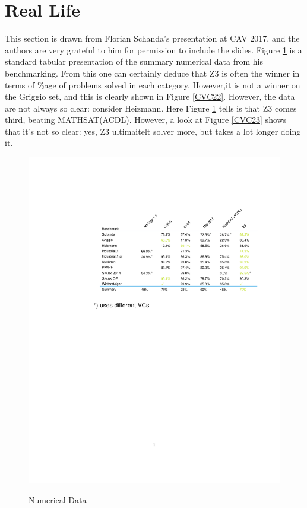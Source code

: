 \documentclass{easychair}
\begin{document}
\section{Real Life}
This section is drawn from Florian Schanda's presentation at CAV 2017, and the authors are very grateful to him for permission to include the slides.  Figure \ref{CVC16} is a standard tabular presentation of the summary numerical data from his benchmarking. From this one can certainly deduce that Z3 is often the winner in terms of \%age of problems solved in each category.  However,it is not a winner on the Griggio set, and this is clearly shown in Figure \ref{CVC22}. However, the data are not always so clear: consider Heizmann. Here Figure \ref{CVC16} tells is that Z3 comes third, beating MATHSAT(ACDL). However, a look at Figure  \ref{CVC23} shows that it's not so clear: yes, Z3 ultimaitelt solver more, but takes a lot longer doing it.
\begin{figure}[h]
\caption{Numerical Data\label{CVC16}}
\vskip-120pt
{\hskip-180pt\includegraphics{ExtractCVC16trim.pdf}}
\end{figure}
\end{document}

